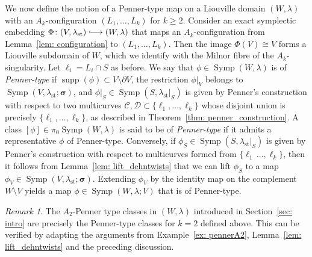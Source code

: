 \documentclass[12pt]{article}
\renewcommand{\ge}{\geqslant}
\newcommand*{\longhookrightarrow}{\ensuremath{\lhook\joinrel\relbar\joinrel\rightarrow}}
\theoremstyle{theorem}
\theoremstyle{definition}
\theoremstyle{remark}
\newtheorem{remark}[theorem]{Remark}
\numberwithin{equation}{section}
\newcommand{\p}{\partial}
\DeclareMathOperator{\supp}{supp}
\DeclareMathOperator{\Symp}{Symp}
\DeclareMathOperator{\st}{st}
\begin{document}
We now define the notion of a Penner-type map on a Liouville domain $(W,\lambda)$ with an $A_k$-configuration $(L_1,\dots,L_k)$ for $k\ge 2$.
Consider an exact symplectic embedding $\Phi\colon (V,\lambda_{\st})\longhookrightarrow (W,\lambda)$ that maps an $A_k$-configuration from Lemma~\ref{lem: configuration} to $(L_1,\dots,L_k)$.
Then the image $\Phi(V)\cong V$ forms a Liouville subdomain of $W$, which we identify with the Milnor fibre of the $A_k$-singularity.
Let $\ell_i=L_i\cap S$ as before.
We say that $\phi\in\Symp(W,\lambda)$ is of \emph{Penner-type} if $\supp(\phi)\subset V\setminus \p V$, the restriction $\phi|_V$ belongs to $\Symp(V,\lambda_{\st};{\bm \sigma})$, and $\phi|_S\in\Symp(S,\lambda_{\st}|_S)$ is given by Penner's construction with respect to two multicurves $\mathcal{C},\mathcal{D}\subset\{\ell_1,\dots,\ell_k\}$ whose disjoint union is precisely $\{\ell_1,\dots,\ell_k\}$, as described in Theorem~\ref{thm: penner_construction}.
A class $[\phi]\in\pi_0\Symp(W,\lambda)$ is said to be of \emph{Penner-type} if it admits a representative $\phi$ of Penner-type.
Conversely, if $\phi_S\in\Symp(S,\lambda_{\st}|_S)$ is given by Penner's construction with respect to multicurves formed from $\{\ell_1\,\dots,\ell_k\}$, then it follows from Lemma~\ref{lem: lift_dehntwists} that we can lift $\phi_S$ to a map $\phi_V\in\Symp(V,\lambda_{\st};{\bm \sigma})$.
Extending $\phi_V$ by the identity map on the complement $W\setminus V$ yields a map $\phi\in\Symp(W,\lambda;V)$ that is of Penner-type.

\begin{remark}\label{rem: twopenner_notions}
The $A_2$-Penner type classes in $(W,\lambda)$ introduced in Section~\ref{sec: intro} are precisely the Penner-type classes for $k=2$ defined above.
This can be verified by adapting the arguments from Example~\ref{ex: pennerA2}, Lemma~\ref{lem: lift_dehntwists} and the preceding discussion.
\end{remark}
\end{document}
